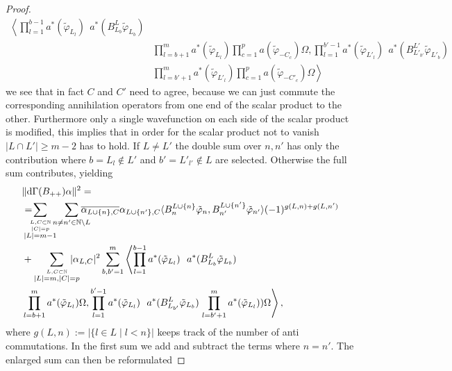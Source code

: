 \documentclass[b5paper,draft,openbib,12pt]{memoir}
\begin{document}
\begin{proof}
\begin{align}
\left\langle \prod_{l=1}^{b-1} a^*(\tilde{\varphi}_{L_l})  ~~ a^*(B^{L}_{L_b} \tilde{\varphi}_{L_b})\right.  \\\nonumber
&\prod_{l=b+1}^m a^*(\tilde{\varphi}_{L_l}) \prod_{c=1}^p a(\tilde{\varphi}_{-C_c}) \Omega, 
\prod_{l=1}^{b'-1} a^*(\tilde{\varphi}_{L'_l})  ~~ a^*(B_{L'_{b'}}^{L'} \tilde{\varphi}_{L'_b})  \\
&\left.\prod_{l=b'+1}^m a^*(\tilde{\varphi}_{L'_l}) \prod_{c=1}^p a(\tilde{\varphi}_{-C'_c}) \Omega\right\rangle
\end{align}
we see that in fact \(C\) and \(C'\) need to agree, because we can just commute the corresponding annihilation operators from one end of the 
scalar product to the other. Furthermore only a single wavefunction on each side of the scalar product is modified, this implies that in order for the
scalar product not to vanish \(|L\cap L'|\ge m-2\) has to hold. If \(L\neq L'\) the double sum over \(n,n'\) has only the contribution where 
\(b=L_l \not\in L'\) and \(b'=L'_{l'}\not\in L\) are selected. Otherwise the full sum contributes, yielding
\begin{align}\nonumber
&\|\mathrm{d}\Gamma(B_{++})\alpha\|^2 = \\\nonumber
&= \hspace{-0.4cm}\sum_{\overset{L,C\subset \mathbb{N}}{\overset{|C|=p}{|L|=m-1}}}\hspace{-0.2cm}\sum_{n\neq n'\in\mathbb{N}\backslash L }
\hspace{-0.4cm}\overline{\alpha_{L\cup\{n\},C}}\alpha_{L\cup\{n'\},C}
 \langle B^{L\cup\{n\}}_n \tilde{\varphi}_{n}, B^{L\cup\{n'\}}_{n'}\tilde{\varphi}_{n'}\rangle (-1)^{g(L,n)+g(L,n')}\\\label{B++estimate}
&+\sum_{\overset{L,C\subset \mathbb{N}}{|L|=m,|C|=p}}\hspace{-0.4cm} |\alpha_{L,C}|^2
 \sum_{b,b'=1}^m 
\left\langle \prod_{l=1}^{b-1} a^*(\tilde{\varphi}_{L_l})  ~~ a^*(B^{L}_{L_b} \tilde{\varphi}_{L_b})\right.  \\\nonumber
&\prod_{l=b+1}^m a^*(\tilde{\varphi}_{L_l}) \Omega, 
\prod_{l=1}^{b'-1} a^*(\tilde{\varphi}_{L_l})  ~~ a^*(B_{L_{b'}}^{L} \tilde{\varphi}_{L_b})  \left.\prod_{l=b'+1}^m a^*(\tilde{\varphi}_{L_l}) ) \Omega\right\rangle,
\end{align}
where \(g(L,n):=|\{l\in L \mid l<n\}|\) keeps track of the number of anti commutations. In the first sum we add and subtract the terms 
where \(n=n'\). The enlarged sum can then be reformulated


\end{proof}
\end{document}
